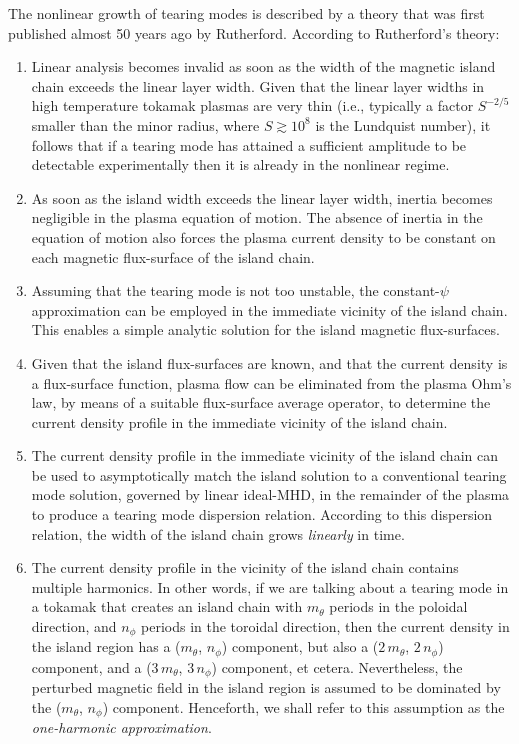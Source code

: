 \documentclass[12pt,prb,aps]{revtex4-1}
\begin{document}
 The nonlinear growth of tearing modes is described by a theory that was first published almost 50 years ago by Rutherford.\cite{ruth} According to Rutherford's theory:
 \begin{enumerate}
 \item Linear analysis becomes invalid as soon as the width of the magnetic island chain exceeds the linear layer width.
 Given that the linear layer widths in high temperature tokamak plasmas are very thin (i.e., typically a factor $S^{-2/5}$
 smaller than the minor radius, where $S\gtrsim 10^8$ is the Lundquist number),\cite{fkr} it follows that if a tearing mode has attained a sufficient amplitude to be detectable experimentally then it is already in the nonlinear regime. 
 \item As soon as the island width exceeds the linear layer width,  inertia becomes negligible in the
 plasma equation of motion.  The absence of inertia in the equation of motion also
 forces the plasma current density to be constant on  each magnetic flux-surface of the island chain. 
 \item Assuming that the tearing mode is not too unstable, the constant-$\psi$ approximation can be employed in the
 immediate vicinity of the island chain.\cite{fkr} This enables a simple analytic solution for the island magnetic flux-surfaces. 
 \item Given that the island flux-surfaces are known, and that the current density is a flux-surface function, plasma
 flow can be eliminated from the plasma Ohm's law, by means of a suitable flux-surface average operator, to determine the
 current density profile in the immediate vicinity of the island chain.
 \item The current density profile in the immediate vicinity of the island chain can be used to asymptotically match
 the island solution to a conventional tearing mode solution, 
governed by 
 linear ideal-MHD,  in the remainder  of the plasma to produce a tearing mode dispersion relation. According to this dispersion
 relation, the width of the island chain grows {\em linearly}\/ in time.
 \item The current density profile in the vicinity of the island chain contains multiple harmonics. In other words,
 if we are talking about a tearing mode in a tokamak that creates an island chain with $m_\theta$ periods in the poloidal direction, and $n_\phi$ periods in the
 toroidal direction, then the current density in the island region has a ($m_\theta$, $n_\phi$) component, but also a  ($2\,m_\theta$, $2\,n_\phi$) component, and a ($3\,m_\theta$, $3\,n_\phi$) component, et cetera. Nevertheless, the
 perturbed magnetic field in the island region is assumed to be dominated by the ($m_\theta$, $n_\phi$) component. Henceforth, we shall refer to this assumption as the {\em one-harmonic approximation}. 
 \end{enumerate}
 
\end{document}
